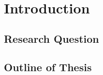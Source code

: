 \chapter{Introduction\label{ch:intro}}

\lipsum[1-2]

\section{Research Question\label{sec:I-researchquestion}}

\lipsum[1-2]

\section{Outline of Thesis\label{sec:I-outline}}

\lipsum[1-2]
